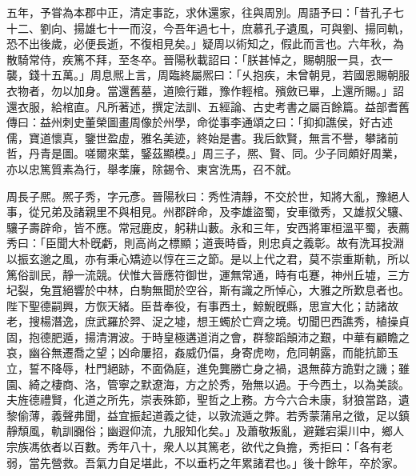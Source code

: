\begin{pinyinscope}
五年，予甞為本郡中正，清定事訖，求休還家，往與周別。周語予曰：「昔孔子七十二、劉向、揚雄七十一而沒，今吾年過七十，庶慕孔子遺風，可與劉、揚同軌，恐不出後歲，必便長逝，不復相見矣。」疑周以術知之，假此而言也。六年秋，為散騎常侍，疾篤不拜，至冬卒。晉陽秋載詔曰：「朕甚悼之，賜朝服一具，衣一襲，錢十五萬。」周息熈上言，周臨終屬熈曰：「乆抱疾，未曾朝見，若國恩賜朝服衣物者，勿以加身。當還舊墓，道險行難，豫作輕棺。殯斂已畢，上還所賜。」詔還衣服，給棺直。凡所著述，撰定法訓、五經論、古史考書之屬百餘篇。益部耆舊傳曰：益州刺史董榮圖畫周像於州學，命從事李通頌之曰：「抑抑譙侯，好古述儒，寶道懷真，鑒世盈虛，雅名美迹，終始是書。我后欽賢，無言不譽，攀諸前哲，丹青是圖。嗟爾來葉，鋻茲顯模。」周三子，熈、賢、同。少子同頗好周業，亦以忠篤質素為行，舉孝廉，除錫令、東宮洗馬，召不就。

周長子熈。熈子秀，字元彥。晉陽秋曰：秀性清靜，不交於世，知將大亂，豫絕人事，從兄弟及諸親里不與相見。州郡辟命，及李雄盜蜀，安車徵秀，又雄叔父驤、驤子壽辟命，皆不應。常冠鹿皮，躬耕山藪。永和三年，安西將軍桓溫平蜀，表薦秀曰：「臣聞大朴旣虧，則高尚之標顯；道喪時昏，則忠貞之義彰。故有洗耳投淵以振玄邈之風，亦有秉心矯迹以惇在三之節。是以上代之君，莫不崇重斯軌，所以篤俗訓民，靜一流競。伏惟大晉應符御世，運無常通，時有屯蹇，神州丘墟，三方圮裂，兔罝絕響於中林，白駒無聞於空谷，斯有識之所悼心，大雅之所歎息者也。陛下聖德嗣興，方恢天緒。臣昔奉役，有事西土，鯨鯢旣縣，思宣大化；訪諸故老，搜楊潛逸，庶武羅於羿、浞之墟，想王蠋於亡齊之境。切聞巴西譙秀，植操貞固，抱德肥遁，揚清渭波。于時皇極遘道消之會，群黎蹈顛沛之艱，中華有顧瞻之哀，幽谷無遷喬之望；凶命屢招，姦威仍偪，身寄虎吻，危同朝露，而能抗節玉立，誓不降辱，杜門絕跡，不面偽庭，進免龔勝亡身之禍，退無薛方詭對之譏；雖園、綺之棲商、洛，管寧之默遼海，方之於秀，殆無以過。于今西土，以為美談。夫旌德禮賢，化道之所先，崇表殊節，聖哲之上務。方今六合未康，豺狼當路，遺黎偷薄，義聲弗聞，益宜振起道義之徒，以敦流遁之弊。若秀蒙蒲帛之徵，足以鎮靜頹風，軌訓嚻俗；幽遐仰流，九服知化矣。」及蕭敬叛亂，避難宕渠川中，鄉人宗族馮依者以百數。秀年八十，衆人以其篤老，欲代之負擔，秀拒曰：「各有老弱，當先營救。吾氣力自足堪此，不以垂朽之年累諸君也。」後十餘年，卒於家。


\end{pinyinscope}